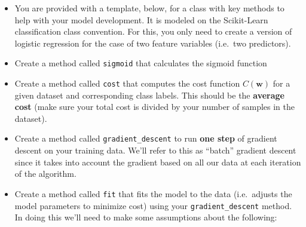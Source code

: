 \documentclass[
  letterpaper,
  DIV=11,
  numbers=noendperiod]{scrartcl}
\begin{document}
\begin{itemize}
\item
  You are provided with a template, below, for a class with key methods
  to help with your model development. It is modeled on the Scikit-Learn
  classification class convention. For this, you only need to create a
  version of logistic regression for the case of two feature variables
  (i.e.~two predictors).
\item
  Create a method called \texttt{sigmoid} that calculates the sigmoid
  function
\item
  Create a method called \texttt{cost} that computes the cost function
  \(C(\mathbf{w})\) for a given dataset and corresponding class labels.
  This should be the \textbf{average cost} (make sure your total cost is
  divided by your number of samples in the dataset).
\item
  Create a method called \texttt{gradient\_descent} to run \textbf{one
  step} of gradient descent on your training data. We'll refer to this
  as ``batch'' gradient descent since it takes into account the gradient
  based on all our data at each iteration of the algorithm.
\item
  Create a method called \texttt{fit} that fits the model to the data
  (i.e.~adjusts the model parameters to minimize cost) using your
  \texttt{gradient\_descent} method. In doing this we'll need to make
  some assumptions about the following:


\end{itemize}
\end{document}
